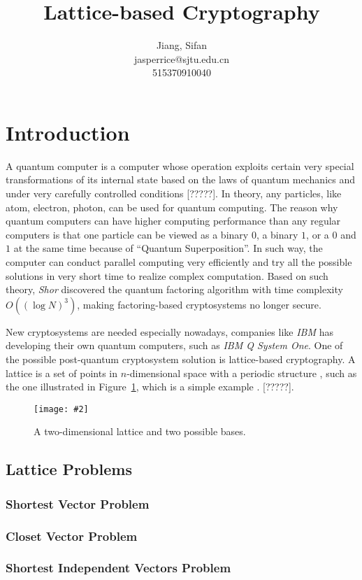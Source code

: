 \documentclass[11pt,a4paper]{article}
\title{
	Lattice-based Cryptography
}
\author{
	Jiang, Sifan\\
	jasperrice@sjtu.edu.cn\\
	515370910040
}
\newcommand{\image}[3]{
	\begin{figure}[!ht]
		\centering
	    \texttt{[image: \#2]}
		\caption{#3}
		\label{fig:#2}
	\end{figure}
}
\begin{document}
\maketitle

\section{Introduction}
\par A quantum computer is a computer whose operation exploits certain very special transformations of its internal state based on the laws of quantum mechanics and under very carefully controlled conditions [?????]. In theory, any particles, like atom, electron, photon, can be used for quantum computing. The reason why quantum computers can have higher computing performance than any regular computers is that one particle can be viewed as a binary $0$, a binary $1$, or a $0$ and $1$ at the same time because of ``Quantum Superposition''. In such way, the computer can conduct parallel computing very efficiently and try all the possible solutions in very short time to realize complex computation. Based on such theory, \textit{Shor} discovered the quantum factoring algorithm with time complexity $O((\log N)^{3})$, making factoring-based cryptosystems no longer secure.
\par New cryptosystems are needed especially nowadays, companies like \textit{IBM} has developing their own quantum computers, such as \textit{IBM Q System One}. One of the possible post-quantum cryptosystem solution is lattice-based cryptography. A lattice is a set of points in $n$-dimensional space with a periodic structure , such as the one illustrated in Figure~\ref{fig:2dlattice}, which is a simple example . [?????].
\image{0.5}{2dlattice}{A two-dimensional lattice and two possible bases.}

\subsection{Lattice Problems}
\subsubsection{Shortest Vector Problem}

\subsubsection{Closet Vector Problem}

\subsubsection{Shortest Independent Vectors Problem}
\end{document}

